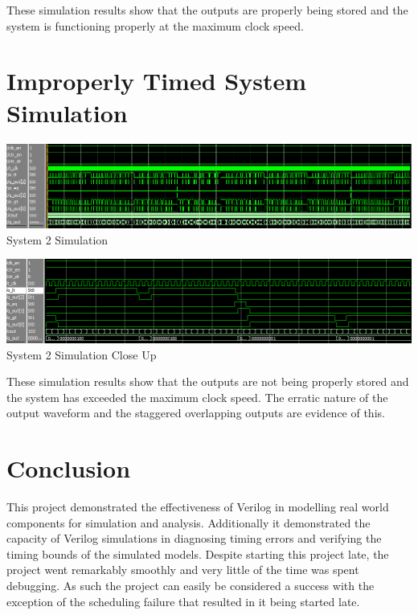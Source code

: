 \documentclass[12pt,letterpaper,titlepage]{article}
\begin{document}
\begin{raggedright}
These simulation results show that the outputs are properly being stored and the system is functioning properly at the maximum clock speed.

\pagebreak

\section{Improperly Timed System Simulation}
\begin{center}
\includegraphics[width=\textwidth]{tb_sys2}
System 2 Simulation
\end{center}
\begin{center}
\includegraphics[width=\textwidth]{tb_sys2_2}
System 2 Simulation Close Up 
\end{center}

These simulation results show that the outputs are not being properly stored and the system has exceeded the maximum clock speed. The erratic nature of the output waveform and the staggered overlapping outputs are evidence of this.


\section{Conclusion}

This project demonstrated the effectiveness of Verilog in modelling real world components for simulation and analysis. Additionally it demonstrated the capacity of Verilog simulations in diagnosing timing errors and verifying the timing bounds of the simulated models. Despite starting this project late, the project went remarkably smoothly and very little of the time was spent debugging. As such the project can easily be considered a success with the exception of the scheduling failure that resulted in it being started late.

\end{raggedright}
\end{document}
